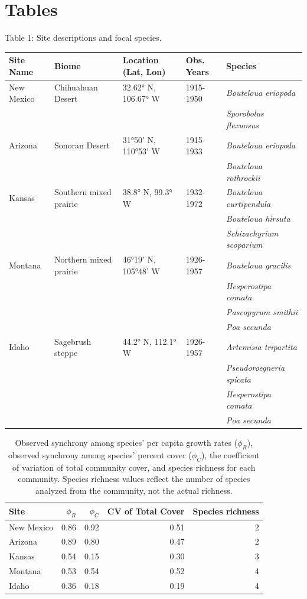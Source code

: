 \documentclass[12pt,]{article}
\begin{document}
\setlength{\parindent}{0ex} \newpage{}

\section{Tables}

\singlespacing

Table 1: Site descriptions and focal species. \footnotesize

\begin{longtable}[c]{@{}lllll@{}}
\toprule
Site Name & Biome & Location (Lat, Lon) & Obs. Years &
Species\tabularnewline
\midrule
\endhead
New Mexico & Chihuahuan Desert & 32.62° N, 106.67° W & 1915-1950 &
\emph{Bouteloua eriopoda}\tabularnewline
& & & & \emph{Sporobolus flexuosus}\tabularnewline
Arizona & Sonoran Desert & 31°50' N, 110°53' W & 1915-1933 &
\emph{Bouteloua eriopoda}\tabularnewline
& & & & \emph{Bouteloua rothrockii}\tabularnewline
Kansas & Southern mixed prairie & 38.8° N, 99.3° W & 1932-1972 &
\emph{Bouteloua curtipendula}\tabularnewline
& & & & \emph{Bouteloua hirsuta}\tabularnewline
& & & & \emph{Schizachyrium scoparium}\tabularnewline
Montana & Northern mixed prairie & 46°19' N, 105°48' W & 1926-1957 &
\emph{Bouteloua gracilis}\tabularnewline
& & & & \emph{Hesperostipa comata}\tabularnewline
& & & & \emph{Pascopyrum smithii}\tabularnewline
& & & & \emph{Poa secunda}\tabularnewline
Idaho & Sagebrush steppe & 44.2° N, 112.1° W & 1926-1957 &
\emph{Artemisia tripartita}\tabularnewline
& & & & \emph{Pseudoroegneria spicata}\tabularnewline
& & & & \emph{Hesperostipa comata}\tabularnewline
& & & & \emph{Poa secunda}\tabularnewline
\bottomrule
\end{longtable}

\normalsize

\pagebreak{}

\begin{table}[ht]
\centering
\caption{Observed synchrony among species' per capita growth rates ($\phi_{R}$), observed synchrony among species' percent cover ($\phi_{C}$), the coefficient of variation of total community cover, and species richness for each community. Species richness values reflect the number of species analyzed from the community, not the actual richness.} 
\begingroup\normalsize
\begin{tabular}{lrrrr}
  \hline
Site & $\phi_{R}$ & $\phi_{C}$ & CV of Total Cover & Species richness \\ 
  \hline
New Mexico & 0.86 & 0.92 & 0.51 &   2 \\ 
  Arizona & 0.89 & 0.80 & 0.47 &   2 \\ 
  Kansas & 0.54 & 0.15 & 0.30 &   3 \\ 
  Montana & 0.53 & 0.54 & 0.52 &   4 \\ 
  Idaho & 0.36 & 0.18 & 0.19 &   4 \\ 
   \hline
\end{tabular}
\endgroup
\end{table}
\end{document}
